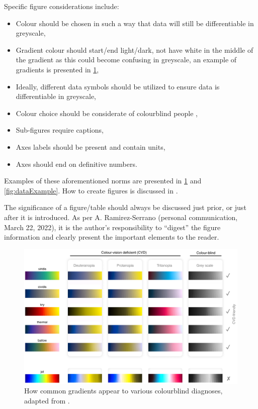 \noindent
Specific figure considerations include: 
\begin{itemize}
	\item Colour should be chosen in such a way that data will still be differentiable in greyscale,
	\item Gradient colour should start/end light/dark, not have white in the middle of the gradient as this could become confusing in greyscale, an example of gradients is presented in \cref{fig:gradientExample},
	\item Ideally, different data symbols should be utilized to ensure data is differentiable in greyscale, 
	\item Colour choice should be considerate of colourblind people \cite{colourScienceMisuse},
	\item Sub-figures require captions, 
	\item Axes labels should be present and contain units, 
	\item Axes should end on definitive numbers. 
\end{itemize}

\noindent
Examples of these aforementioned norms are presented in \cref{fig:gradientExample} and \ref{fig:dataExample}. 
How to create figures is discussed in . 

The significance of a figure/table should always be discussed just prior, or just after it is introduced. 
As per A. Ramirez-Serrano (personal communication, March 22, 2022), it is the author's responsibility to ``digest'' the figure information and clearly present the important elements to the reader. 


\begin{figure}[hbt!]
	\centering
	\captionsetup{width=\textwidth}
	\includegraphics[width=\textwidth]{Photos/Figures/gradients.png}
	\caption{How common gradients appear to various colourblind diagnoses, adapted from \citeauthor{colourScienceMisuse} \cite{colourScienceMisuse}.}
	\label{fig:gradientExample}
	\hfill
\end{figure}



